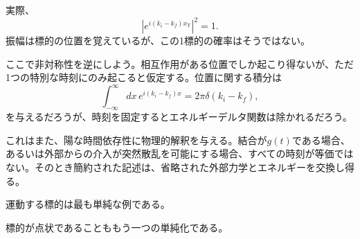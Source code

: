 実際、
\begin{equation}
\left|e^{i(k_i-k_f)x_{\mathrm T}}\right|^2=1.
\end{equation}
振幅は標的の位置を覚えているが、この1標的の確率はそうではない。

ここで非対称性を逆にしよう。相互作用がある位置でしか起こり得ないが、ただ1つの特別な時刻にのみ起こると仮定する。位置に関する積分は
\begin{equation}
\int_{-\infty}^{\infty}dx\,
e^{i(k_i-k_f)x}
=2\pi\delta(k_i-k_f),
\end{equation}
を与えるだろうが、時刻を固定するとエネルギーデルタ関数は除かれるだろう。

\begin{classroomqa}
\end{classroomqa}

これはまた、陽な時間依存性に物理的解釈を与える。結合が\(g(t)\)である場合、あるいは外部からの介入が突然散乱を可能にする場合、すべての時刻が等価ではない。そのとき簡約された記述は、省略された外部力学とエネルギーを交換し得る。

\begin{classroomqa}
\end{classroomqa}

運動する標的は最も単純な例である。

\begin{classroomqa}
\end{classroomqa}

標的が点状であることももう一つの単純化である。

